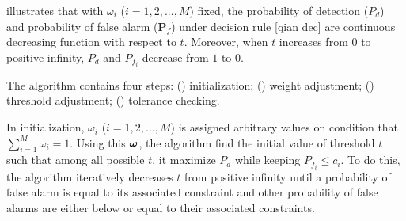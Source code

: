 \cite{zhang2000efficient} illustrates that with $\omega_i$ ($i=1, 2, ..., M$) fixed, the probability of detection ($P_d$) and probability of false alarm ($\mathbf{P}_f$) under decision rule \eqref{qian dec} are continuous decreasing function with respect to $t$. 
Moreover, when $t$ increases from $0$ to positive infinity, $P_d$ and $P_{f_i}$ decrease from $1$ to $0$.

The algorithm contains four steps: () initialization; () weight adjustment; () threshold adjustment; () tolerance checking.

In initialization, $\omega_i$ ($i=1, 2, ..., M$)  is assigned arbitrary values on condition that $\sum_{i=1}^{M}\omega_i = 1$. Using this $\boldsymbol{\omega}$, the algorithm find the initial value of threshold $t$ such that among all possible $t$, it maximize $P_d$ while keeping $P_{f_i} \leq c_i$. 
To do this, the algorithm iteratively decreases $t$ from positive infinity until a probability of false alarm is equal to its associated constraint and other probability of false alarms are either below or equal to their associated constraints.   

